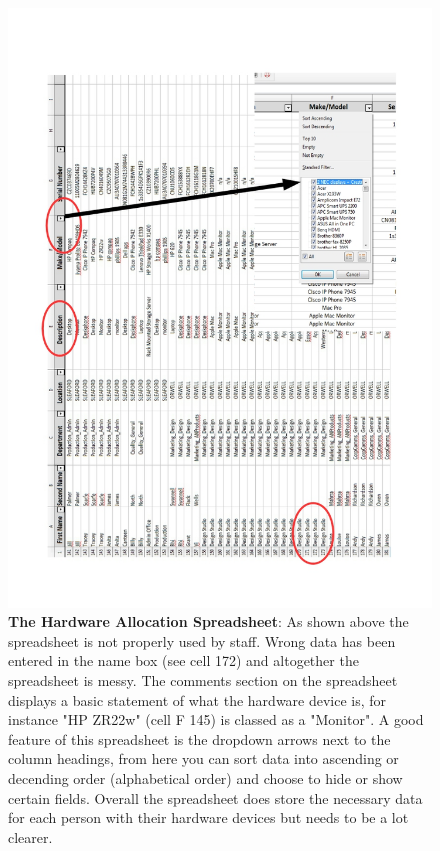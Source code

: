 \begin{figure}[H]
\includegraphics[width=.9\textwidth,height=.9\textheight,keepaspectratio]{Spreadsheet2.jpg}
\caption{\textbf{The Hardware Allocation Spreadsheet}: As shown above the spreadsheet is not properly used by staff. Wrong data has been entered in the name box (see cell 172) and altogether the spreadsheet is messy. The comments section on the spreadsheet displays a basic statement of what the hardware device is, for instance "HP ZR22w" (cell F 145) is classed as a "Monitor". A good feature of this spreadsheet is the dropdown arrows next to the column headings, from here you can sort data into ascending or decending order (alphabetical order) and choose to hide or show certain fields. Overall the spreadsheet does store the necessary data for each person with their hardware devices but needs to be a lot clearer.} \label{Spreadsheet}
\end{figure}

